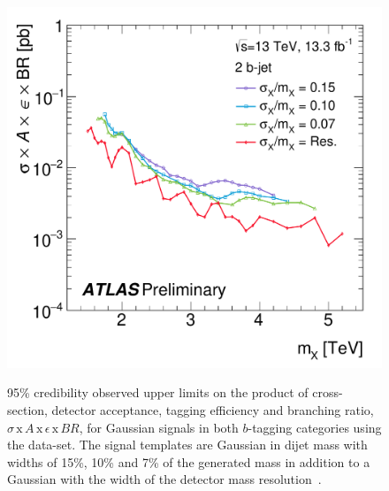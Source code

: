 \begin{figure}[!ht]
  \begin{center}
    \captionsetup[subfigure]{aboveskip=0pt,justification=centering}
         {\includegraphics[width=0.49\linewidth, angle=0]{figs/Dibjet/ICHEP/lim-summer_gauss_bb.pdf}}
  \end{center}
  \vspace{-1em}
  \caption[95\% credibility observed upper limits
    on the product of cross-section, detector acceptance, tagging efficiency and branching ratio
    for Gaussian signals using the \summer{} data-set.]
  {95\% credibility observed upper limits
    on the product of cross-section, detector acceptance, tagging efficiency and branching ratio,
    $\sigma\,\text{x}\,\mathit{A}\,\text{x}\,\epsilon\,\text{x}\,\mathit{BR}$,
    for Gaussian signals in both $b$-tagging categories using the \summer{} data-set.
    The signal templates are Gaussian in dijet  mass with
    widths of 15\%, 10\% and 7\% of the generated mass
    in addition to a Gaussian with the width of the detector mass resolution~\cite{dibjet-ichep_conf}.
  }
  \label{fig:lim-summer_gauss}
\end{figure}

